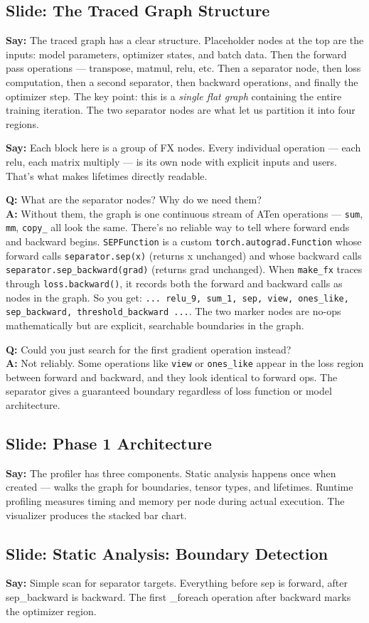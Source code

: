 \documentclass[11pt]{article}
\newcommand{\slide}[1]{\subsection*{Slide: #1}}
\newcommand{\say}[1]{\textbf{Say:} #1}
\newcommand{\qa}[2]{\textcolor{question}{\textbf{Q:} #1} \\ \textbf{A:} #2}
\begin{document}
\slide{The Traced Graph Structure}
\say{The traced graph has a clear structure. Placeholder nodes at the top are the inputs: model parameters, optimizer states, and batch data. Then the forward pass operations --- transpose, matmul, relu, etc. Then a separator node, then loss computation, then a second separator, then backward operations, and finally the optimizer step. The key point: this is a \emph{single flat graph} containing the entire training iteration. The two separator nodes are what let us partition it into four regions.}

\say{Each block here is a group of FX nodes. Every individual operation --- each relu, each matrix multiply --- is its own node with explicit inputs and users. That's what makes lifetimes directly readable.}

\qa{What are the separator nodes? Why do we need them?}{Without them, the graph is one continuous stream of ATen operations --- \texttt{sum}, \texttt{mm}, \texttt{copy\_} all look the same. There's no reliable way to tell where forward ends and backward begins. \texttt{SEPFunction} is a custom \texttt{torch.autograd.Function} whose forward calls \texttt{separator.sep(x)} (returns x unchanged) and whose backward calls \texttt{separator.sep\_backward(grad)} (returns grad unchanged). When \texttt{make\_fx} traces through \texttt{loss.backward()}, it records both the forward and backward calls as nodes in the graph. So you get: \texttt{... relu\_9, sum\_1, sep, view, ones\_like, sep\_backward, threshold\_backward ...}. The two marker nodes are no-ops mathematically but are explicit, searchable boundaries in the graph.}

\qa{Could you just search for the first gradient operation instead?}{Not reliably. Some operations like \texttt{view} or \texttt{ones\_like} appear in the loss region between forward and backward, and they look identical to forward ops. The separator gives a guaranteed boundary regardless of loss function or model architecture.}

\slide{Phase 1 Architecture}
\say{The profiler has three components. Static analysis happens once when created --- walks the graph for boundaries, tensor types, and lifetimes. Runtime profiling measures timing and memory per node during actual execution. The visualizer produces the stacked bar chart.}

\slide{Static Analysis: Boundary Detection}
\say{Simple scan for separator targets. Everything before sep is forward, after sep\_backward is backward. The first \_foreach operation after backward marks the optimizer region.}
\end{document}
